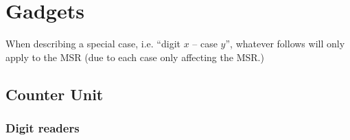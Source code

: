 \section{Gadgets}
\label{gadgets}



\newcommand{\warpunit}{{\tt Warp\_Unit}}
\newcommand{\prewarp}{{\tt Pre\_Warp}}
\newcommand{\firstwarp}{{\tt First\_Warp}}
\newcommand{\warpbridge}{{\tt Warp\_Bridge}}
\newcommand{\secondwarp}{{\tt Second\_Warp}}
\newcommand{\postwarp}{{\tt Post\_Warp}}

\newcommand{\dtop}{{\tt Digit\_Top}}
\newcommand{\dwriter}{{\tt Digit\_Writer}}
\newcommand{\dreader}{{\tt Digit\_Reader}}

\newcommand{\returnfromdonereadnextrow}{{\tt Return\_From\_Digit1\_Read\_Next\_Row}}
\newcommand{\returnfromdtworeadnextrow}{{\tt Return\_From\_Digit2\_Read\_Next\_Row}}
\newcommand{\returnfromdthreereadnextrow}{{\tt Return\_From\_Digit3\_Read\_Next\_Row}}

\newcommand{\returnfromdonereaddtwo}{{\tt Return\_From\_Digit1\_Read\_Digit2}}
\newcommand{\returnfromdonereaddtwocasetwo}{{\tt Return\_From\_Digit1\_Read\_Digit2\_Case2}}
\newcommand{\returnfromdtworeaddthree}{{\tt Return\_From\_Digit2\_Read\_Digit3}}
\newcommand{\returnfromdthreereaddone}{{\tt Return\_From\_Digit3\_Read\_Digit1}}

\newcommand{\inc}{{\tt carry}}

\newcommand{\dtopdonecaseone}{{\tt Digit\_Top\_Digit1\_Case1}}
\newcommand{\dtopdonecasetwo}{{\tt Digit\_Top\_Digit1\_Case2}}
\newcommand{\dtopdtwocasetwo}{{\tt Digit\_Top\_Digit2\_Case2}}
\newcommand{\dtopdthreecasethree}{{\tt Digit\_Top\_Digit3\_Case3}}

When describing a special case, i.e. ``digit $x$ -- case $y$'', whatever follows
will only apply to the MSR (due to each case only affecting the MSR.)

\subsection{ Counter Unit }



    \subsubsection{ Digit readers }

